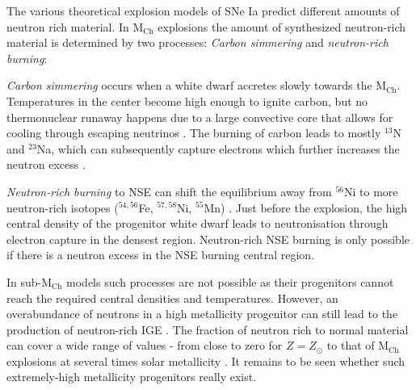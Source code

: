 \documentclass[fleqn,usenatbib]{mnras}
\begin{document}
\label{Implications}The various theoretical explosion models of SNe Ia predict different amounts of neutron rich material. In M$_{\text{Ch}}$ explosions the amount of synthesized neutron-rich material is determined by two processes: \textit{Carbon simmering} and \textit{neutron-rich burning}:
 
\textit{Carbon simmering} occurs when a white dwarf accretes slowly towards the M$_{\text{Ch}}$. Temperatures in the center become high enough to ignite carbon, but no thermonuclear runaway happens due to a large convective core that allows for cooling through escaping neutrinos \citep{2004ApJ...607..921W, 2004ApJ...616.1102W, 2008ApJ...678.1158P}. The burning of carbon leads to mostly $^{13}$N and $^{23}$Na, which can subsequently capture electrons which further increases the neutron excess \citep{2008ApJ...677..160C, 2016ApJ...825...57M}.

\textit{Neutron-rich burning} to NSE can shift the equilibrium away from $^{56}$Ni to more neutron-rich isotopes ($^{54,56}$Fe, $^{57,58}$Ni, $^{55}$Mn) \citep{1999ApJS..125..439I, 2000ApJ...536..934B}. Just before the explosion, the high central density of the progenitor white dwarf leads to neutronisation through electron capture in the densest region. Neutron-rich NSE burning is only possible if there is a neutron excess in the NSE burning central region. 

In sub-M$_{\text{Ch}}$ models such processes are not possible as their progenitors cannot reach the required central densities and temperatures. However, an overabundance of neutrons in a high metallicity progenitor can still lead to the production of neutron-rich IGE \citep{2003ApJ...590L..83T}. The fraction of neutron rich to normal material can cover a wide range of values - from close to zero for $Z=Z_\odot$ to that of M$_{\text{Ch}}$ explosions at several times solar metallicity \citep{2018ApJ...854...52S}. It remains to be seen whether such extremely-high metallicity progenitors really exist. 
\end{document}
